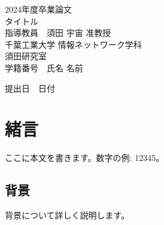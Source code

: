\documentclass[a4paper, 12pt]{ltjsarticle}
\newcommand{\coverpage}{
\begin{titlepage}
\begin{center}
\vspace*{1.5cm}

{\LARGE 2024年度卒業論文}\\[2cm] %

{\Huge {タイトル}}\\[4cm] %

{\LARGE 指導教員　須田 宇宙 准教授}\\[2cm] %
{\LARGE 千葉工業大学 情報ネットワーク学科}\\[0.5cm] %

{\LARGE 須田研究室}\\[2.5cm] %

{\LARGE {学籍番号}　氏名 {名前}} \\[1.5cm] %

\vfill
\end{center}

\begin{flushright}
{\LARGE 提出日　\textnormal{日付}}\\[1.5cm] %
\end{flushright}

\vfill
\end{titlepage}
}
\begin{document}
\coverpage

\tableofcontents

\clearpage

\section{緒言}
ここに本文を書きます。数字の例: 12345。

\subsection{背景}
背景について詳しく説明します。

\end{document}
